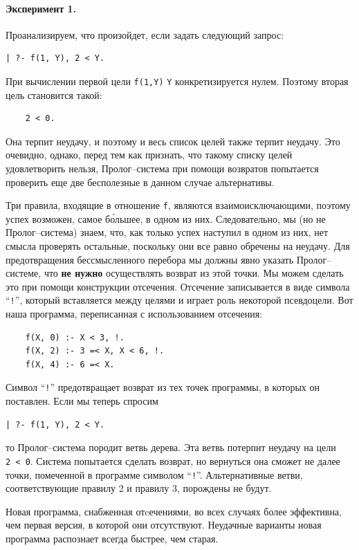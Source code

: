 \documentclass[12pt, openany, twoside]{book} %
\begin{document}
\paragraph{Эксперимент 1.} Проанализируем, что произойдет, если задать следующий запрос:
{\tt \begin{verbatim}
| ?- f(1, Y), 2 < Y.
\end{verbatim}}

При вычислении первой цели {\tt f(1,Y)} {\tt Y} конкретизируется нулем. Поэтому вторая цель становится такой:
{\tt \begin{verbatim}
    2 < 0.
\end{verbatim}}
\noindent Она терпит неудачу, и поэтому и весь список целей также терпит неудачу. Это очевидно, однако, перед тем как признать, что такому списку целей удовлетворить нельзя, Пролог--система при помощи возвратов попытается проверить еще две бесполезные в данном случае альтернативы.

Три правила, входящие в отношение {\tt f}, являются взаимоисключающими, поэтому успех возможен, самое б\'{о}льшее, в одном из них. Следовательно, мы (но не Пролог--система) знаем, что, как только успех наступил в одном из них, нет смысла проверять остальные, поскольку они все равно обречены на неудачу. Для предотвращения бессмысленного перебора мы должны явно указать Пролог--системе, что {\bf не нужно} осуществлять возврат из этой точки. Мы можем сделать это при помощи конструкции отсечения. Отсечение записывается в виде символа ``{\tt !}'', который вставляется между целями и играет роль некоторой псевдоцели. Вот наша программа, переписанная с использованием отсечения:

{\tt \begin{verbatim}
    f(X, 0) :- X < 3, !.
    f(X, 2) :- 3 =< X, X < 6, !.
    f(X, 4) :- 6 =< X.
\end{verbatim}}

Символ ``{\tt !}'' предотвращает возврат из тех точек программы, в которых он поставлен. Если мы теперь спросим
{\tt \begin{verbatim}
| ?- f(1, Y), 2 < Y.
\end{verbatim}}
\noindent то Пролог--система породит ветвь дерева. Эта ветвь потерпит неудачу на цели {\tt 2~<~0}. Система попытается сделать возврат, но вернуться она сможет не далее точки, помеченной в программе символом ``{\tt !}''. Альтернативные ветви, соответствующие правилу 2 и правилу 3, порождены не будут.

Новая программа, снабженная отcечениями, во всех случаях более эффективна, чем первая версия, в которой они отсутствуют. Неудачные варианты новая программа распознает всегда быстрее, чем старая.
\end{document}
